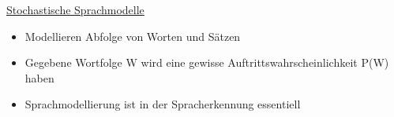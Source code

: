 \documentclass[a4paper,10pt,oneside]{article}
\begin{document}
\underline{Stochastische Sprachmodelle} \\
	\begin{itemize}
		\item Modellieren Abfolge von Worten und Sätzen
		\item Gegebene Wortfolge W wird eine gewisse Auftrittswahrscheinlichkeit P(W) haben
		\item Sprachmodellierung ist in der Spracherkennung essentiell
	\end{itemize}
 		
 		
 		
 		
 		
 		
 		
 		
 		
 		
 		
 		
 		
 		
 		
 		
 		
 		
 		
 		
 		
 		
 	

 
\end{document}

